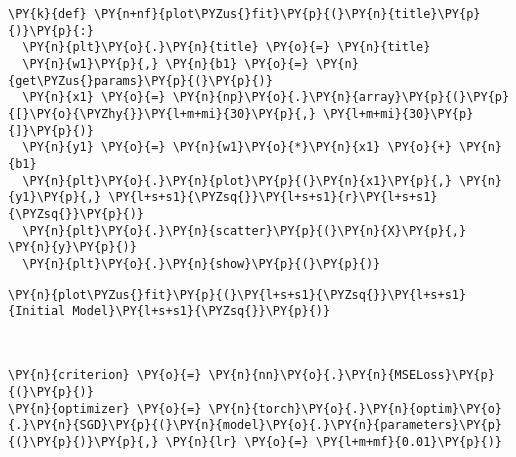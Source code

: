     \begin{tcolorbox}[breakable, size=fbox, boxrule=1pt, pad at break*=1mm,colback=cellbackground, colframe=cellborder]
\begin{Verbatim}[commandchars=\\\{\}]
\PY{k}{def} \PY{n+nf}{plot\PYZus{}fit}\PY{p}{(}\PY{n}{title}\PY{p}{)}\PY{p}{:}
  \PY{n}{plt}\PY{o}{.}\PY{n}{title} \PY{o}{=} \PY{n}{title}
  \PY{n}{w1}\PY{p}{,} \PY{n}{b1} \PY{o}{=} \PY{n}{get\PYZus{}params}\PY{p}{(}\PY{p}{)}
  \PY{n}{x1} \PY{o}{=} \PY{n}{np}\PY{o}{.}\PY{n}{array}\PY{p}{(}\PY{p}{[}\PY{o}{\PYZhy{}}\PY{l+m+mi}{30}\PY{p}{,} \PY{l+m+mi}{30}\PY{p}{]}\PY{p}{)}
  \PY{n}{y1} \PY{o}{=} \PY{n}{w1}\PY{o}{*}\PY{n}{x1} \PY{o}{+} \PY{n}{b1}
  \PY{n}{plt}\PY{o}{.}\PY{n}{plot}\PY{p}{(}\PY{n}{x1}\PY{p}{,} \PY{n}{y1}\PY{p}{,} \PY{l+s+s1}{\PYZsq{}}\PY{l+s+s1}{r}\PY{l+s+s1}{\PYZsq{}}\PY{p}{)}
  \PY{n}{plt}\PY{o}{.}\PY{n}{scatter}\PY{p}{(}\PY{n}{X}\PY{p}{,} \PY{n}{y}\PY{p}{)}
  \PY{n}{plt}\PY{o}{.}\PY{n}{show}\PY{p}{(}\PY{p}{)}
\end{Verbatim}
\end{tcolorbox}

    \begin{tcolorbox}[breakable, size=fbox, boxrule=1pt, pad at break*=1mm,colback=cellbackground, colframe=cellborder]
\begin{Verbatim}[commandchars=\\\{\}]
\PY{n}{plot\PYZus{}fit}\PY{p}{(}\PY{l+s+s1}{\PYZsq{}}\PY{l+s+s1}{Initial Model}\PY{l+s+s1}{\PYZsq{}}\PY{p}{)}
\end{Verbatim}
\end{tcolorbox}

    \begin{center}
    \end{center}
    { \hspace*{\fill} \\}
    
    \begin{tcolorbox}[breakable, size=fbox, boxrule=1pt, pad at break*=1mm,colback=cellbackground, colframe=cellborder]
\begin{Verbatim}[commandchars=\\\{\}]
\PY{n}{criterion} \PY{o}{=} \PY{n}{nn}\PY{o}{.}\PY{n}{MSELoss}\PY{p}{(}\PY{p}{)}
\PY{n}{optimizer} \PY{o}{=} \PY{n}{torch}\PY{o}{.}\PY{n}{optim}\PY{o}{.}\PY{n}{SGD}\PY{p}{(}\PY{n}{model}\PY{o}{.}\PY{n}{parameters}\PY{p}{(}\PY{p}{)}\PY{p}{,} \PY{n}{lr} \PY{o}{=} \PY{l+m+mf}{0.01}\PY{p}{)}
\end{Verbatim}
\end{tcolorbox}

